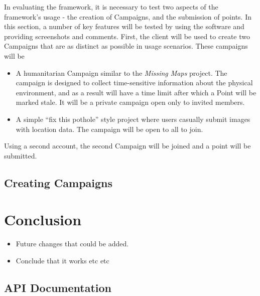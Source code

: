 \documentclass{article}
\let\oldsection\section
\renewcommand\section{\clearpage\oldsection}
\begin{document}
	In evaluating the framework, it is necessary to test two aspects of the framework's usage - the creation of Campaigns, and the submission of points. In this section, a number of key features will be tested by using the software and providing screenshots and comments. First, the client will be used to create two Campaigns that are as distinct as possible in usage scenarios. These campaigns will be

	\begin{itemize}
		\item A humanitarian Campaign similar to the \emph{Missing Maps} project. The campaign is designed to collect time-sensitive information about the physical environment, and as a result will have a time limit after which a Point will be marked stale. It will be a private campaign open only to invited members.
		\item A simple ``fix this pothole'' style project where users casually submit images with location data. The campaign will be open to all to join.
	\end{itemize}

	Using a second account, the second Campaign will be joined and a point will be submitted.

	\subsection{Creating Campaigns}

	\section{Conclusion}
	\label{sec:conclusion}
		\begin{itemize}
			\item Future changes that could be added.
			\item Conclude that it works etc etc
		\end{itemize}

	
	

	\clearpage
	\begin{appendices}
	\oldsection{API Documentation}
	\label{sec:api-docs}
	\end{appendices}
\end{document}
